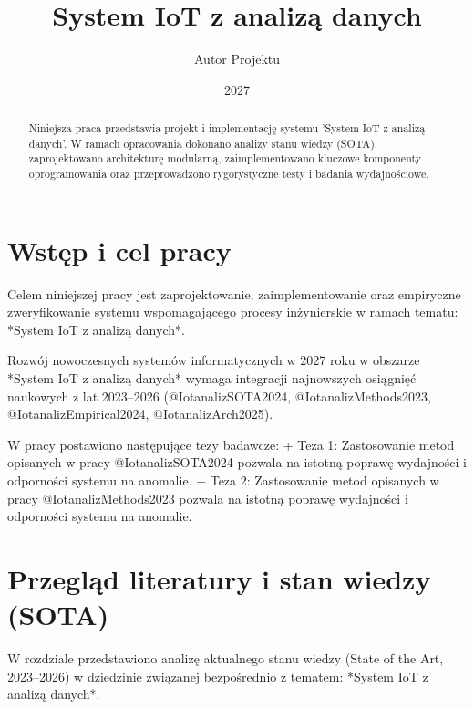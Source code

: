 \documentclass[12pt,a4paper,twoside]{report}
\title{System IoT z analizą danych}
\author{Autor Projektu}
\date{2027}
\begin{document}
\maketitle
\tableofcontents
\newpage
\begin{abstract}
Niniejsza praca przedstawia projekt i implementację systemu 'System IoT z analizą danych'. W ramach opracowania dokonano analizy stanu wiedzy (SOTA), zaprojektowano architekturę modularną, zaimplementowano kluczowe komponenty oprogramowania oraz przeprowadzono rygorystyczne testy i badania wydajnościowe.
\end{abstract}
\newpage
\chapter{Wstęp i cel pracy}

Celem niniejszej pracy jest zaprojektowanie, zaimplementowanie oraz empiryczne zweryfikowanie systemu wspomagającego procesy inżynierskie w ramach tematu: *System IoT z analizą danych*.

Rozwój nowoczesnych systemów informatycznych w 2027 roku w obszarze *System IoT z analizą danych* wymaga integracji najnowszych osiągnięć naukowych z lat 2023–2026 (@IotanalizSOTA2024, @IotanalizMethods2023, @IotanalizEmpirical2024, @IotanalizArch2025).

W pracy postawiono następujące tezy badawcze:
+ Teza 1: Zastosowanie metod opisanych w pracy @IotanalizSOTA2024 pozwala na istotną poprawę wydajności i odporności systemu na anomalie.
+ Teza 2: Zastosowanie metod opisanych w pracy @IotanalizMethods2023 pozwala na istotną poprawę wydajności i odporności systemu na anomalie.



\chapter{Przegląd literatury i stan wiedzy (SOTA)}

W rozdziale przedstawiono analizę aktualnego stanu wiedzy (State of the Art, 2023–2026) w dziedzinie związanej bezpośrednio z tematem: *System IoT z analizą danych*.
\end{document}
